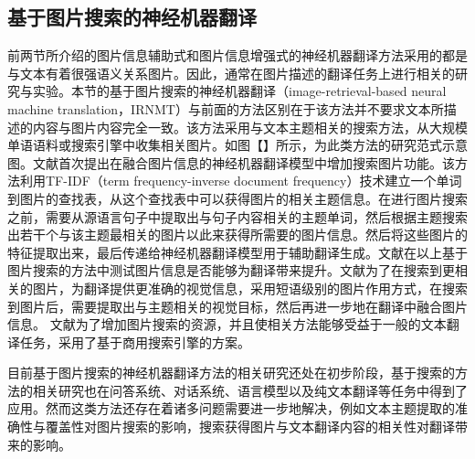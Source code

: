 \subsection{基于图片搜索的神经机器翻译}

前两节所介绍的图片信息辅助式和图片信息增强式的神经机器翻译方法采用的都是与文本有着很强语义关系图片。因此，通常在图片描述的翻译任务上进行相关的研究与实验。本节的基于图片搜索的神经机器翻译（image-retrieval-based neural machine translation，IRNMT）与前面的方法区别在于该方法并不要求文本所描述的内容与图片内容完全一致。该方法采用与文本主题相关的搜索方法，从大规模单语语料或搜索引擎中收集相关图片。如图【】所示，为此类方法的研究范式示意图。文献\cite{118_DBLP:conf/iclr/0001C0USLZ20}首次提出在融合图片信息的神经机器翻译模型中增加搜索图片功能。该方法利用TF-IDF（term frequency-inverse document frequency）技术建立一个单词到图片的查找表，从这个查找表中可以获得图片的相关主题信息。在进行图片搜索之前，需要从源语言句子中提取出与句子内容相关的主题单词，然后根据主题搜索出若干个与该主题最相关的图片以此来获得所需要的图片信息。然后将这些图片的特征提取出来，最后传递给神经机器翻译模型用于辅助翻译生成。文献\cite{20_wu-etal-2021-good}在以上基于图片搜索的方法中测试图片信息是否能够为翻译带来提升。文献\cite{119_fang-feng-2022-neural}为了在搜索到更相关的图片，为翻译提供更准确的视觉信息，采用短语级别的图片作用方式，在搜索到图片后，需要提取出与主题相关的视觉目标，然后再进一步地在翻译中融合图片信息。
文献\cite{120_tang-etal-2022-multimodal}为了增加图片搜索的资源，并且使相关方法能够受益于一般的文本翻译任务，采用了基于商用搜索引擎的方案。

目前基于图片搜索的神经机器翻译方法的相关研究还处在初步阶段，基于搜索的方法的相关研究也在问答系统\cite{121_DBLP:conf/icml/GuuLTPC20}、对话系统\cite{122_DBLP:conf/emnlp/WestonDM18}、语言模型\cite{123_DBLP:conf/iclr/KhandelwalLJZL20}以及纯文本翻译\cite{124_DBLP:conf/aaai/GuWCL18}等任务中得到了应用。然而这类方法还存在着诸多问题需要进一步地解决，例如文本主题提取的准确性与覆盖性对图片搜索的影响，搜索获得图片与文本翻译内容的相关性对翻译带来的影响。
